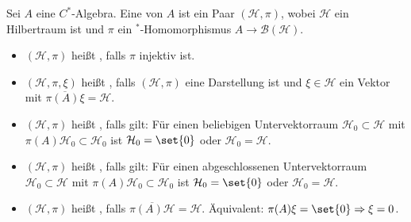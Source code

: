\begin{definition}[{name=[Darstellung]}]
	Sei $A$ eine $C^*$-Algebra. 
	Eine  von $A$ ist ein Paar $(\mathcal{H},\pi)$, wobei $\mathcal{H}$ ein Hilbertraum ist und $\pi$ ein $^*$-Homomorphismus $A \to \mathcal{B}(\mathcal{H})$.
	\begin{itemize}[itemsep=0pt]
		\item $(\mathcal{H},\pi)$ heißt , falls $\pi$ injektiv ist.
		\item $(\mathcal{H},\pi,\xi)$ heißt , falls $(\mathcal{H},\pi)$ eine Darstellung ist und $\xi \in \mathcal{H}$ ein Vektor mit $\overline{\pi(A) \xi}=\mathcal{H}$.
		\item $(\mathcal{H},\pi)$ heißt , falls gilt: 
		Für einen beliebigen Untervektorraum $\mathcal{H}_0 \subset \mathcal{H}$ mit ${\pi(A)\mathcal{H}_0 \subset \mathcal{H}_0}$ ist $\mathcal{H}_0=\set{0}$ oder $\mathcal{H}_0=\mathcal{H}$.
		\item $(\mathcal{H},\pi)$ heißt , falls gilt: 
		Für einen abgeschlossenen Untervektorraum $\mathcal{H}_0 \subset \mathcal{H}$ mit $\pi(A)\mathcal{H}_0 \subset \mathcal{H}_0$ ist $\mathcal{H}_0=\set{0}$ oder $\mathcal{H}_0=\mathcal{H}$.
		\item $(\mathcal{H},\pi)$ heißt , falls $\overline{\pi(A)\mathcal{H}}=\mathcal{H}$. Äquivalent: $\pi(A)\xi = \set{0} \Rightarrow \xi=0$.
	\end{itemize}
\end{definition}

